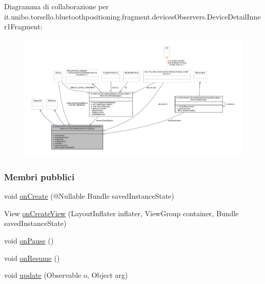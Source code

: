 Diagramma di collaborazione per it.\+unibo.\+torsello.\+bluetoothpositioning.\+fragment.\+devices\+Observers.\+Device\+Detail\+Inner1\+Fragment\+:
\nopagebreak
\begin{figure}[H]
\begin{center}
\leavevmode
\includegraphics[width=350pt]{classit_1_1unibo_1_1torsello_1_1bluetoothpositioning_1_1fragment_1_1devicesObservers_1_1DeviceDetailInner1Fragment__coll__graph}
\end{center}
\end{figure}
\subsubsection*{Membri pubblici}
\begin{DoxyCompactItemize}
\item 
void \hyperlink{classit_1_1unibo_1_1torsello_1_1bluetoothpositioning_1_1fragment_1_1devicesObservers_1_1DeviceDetailInner1Fragment_aa2c5b397a4773bcd426c4ce3f5e291b4_aa2c5b397a4773bcd426c4ce3f5e291b4}{on\+Create} (@Nullable Bundle saved\+Instance\+State)
\item 
View \hyperlink{classit_1_1unibo_1_1torsello_1_1bluetoothpositioning_1_1fragment_1_1devicesObservers_1_1DeviceDetailInner1Fragment_a33d847cb48530082edb1e7d73de2a80a_a33d847cb48530082edb1e7d73de2a80a}{on\+Create\+View} (Layout\+Inflater inflater, View\+Group container, Bundle saved\+Instance\+State)
\item 
void \hyperlink{classit_1_1unibo_1_1torsello_1_1bluetoothpositioning_1_1fragment_1_1devicesObservers_1_1DeviceDetailInner1Fragment_a9629cf5558354f0b8041e5292b93c22a_a9629cf5558354f0b8041e5292b93c22a}{on\+Pause} ()
\item 
void \hyperlink{classit_1_1unibo_1_1torsello_1_1bluetoothpositioning_1_1fragment_1_1devicesObservers_1_1DeviceDetailInner1Fragment_a3a8ef18269a3ca1c237092216ad50b78_a3a8ef18269a3ca1c237092216ad50b78}{on\+Resume} ()
\item 
void \hyperlink{classit_1_1unibo_1_1torsello_1_1bluetoothpositioning_1_1fragment_1_1devicesObservers_1_1DeviceDetailInner1Fragment_a0fead41d291fe9e365b3b4fafd900eb7_a0fead41d291fe9e365b3b4fafd900eb7}{update} (Observable o, Object arg)
\end{DoxyCompactItemize}
